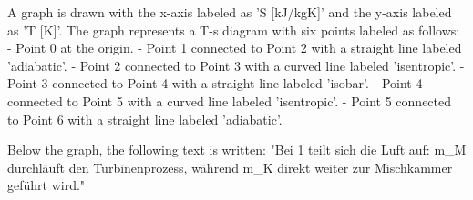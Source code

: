 A graph is drawn with the x-axis labeled as 'S [kJ/kgK]' and the y-axis labeled as 'T [K]'. The graph represents a T-s diagram with six points labeled as follows:  
- Point 0 at the origin.  
- Point 1 connected to Point 2 with a straight line labeled 'adiabatic'.  
- Point 2 connected to Point 3 with a curved line labeled 'isentropic'.  
- Point 3 connected to Point 4 with a straight line labeled 'isobar'.  
- Point 4 connected to Point 5 with a curved line labeled 'isentropic'.  
- Point 5 connected to Point 6 with a straight line labeled 'adiabatic'.  

Below the graph, the following text is written:  
"Bei 1 teilt sich die Luft auf: m_M durchläuft den Turbinenprozess, während m_K direkt weiter zur Mischkammer geführt wird."